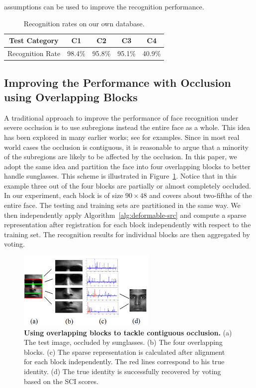 \documentclass[10pt,journal,letterpaper,compsoc]{IEEEtran}
\begin{document}
assumptions can be used to improve the recognition performance.
\begin{table}[h]
\vspace{0mm}
\centering \caption{Recognition rates on our own
database.} \vspace{0mm}
\begin{tabular}{|c|c|c|c|c| }
\hline
Test Category & C1 & C2 & C3 & C4  \\
\hline
\hline
Recognition Rate & 98.4\% & 95.8\% & 95.1\% & 40.9\% \\
\hline
\end{tabular}
\label{tab:UIUC-recognition} \vspace{-5mm}
\end{table}

\subsection{Improving the Performance with Occlusion using Overlapping Blocks}
A traditional approach to improve the performance of face
recognition under severe occlusion is to use subregions instead
the entire face as a whole. This idea has been explored in many
earlier works; see \cite{Pentland1994-CVPR, Wright2009-PAMI}
for examples. Since in most real world cases the occlusion is contiguous, it is reasonable to argue that a minority of the
subregions are likely to be affected by the occlusion. In this
paper, we adopt the same idea and partition the face into four
overlapping blocks to better handle sunglasses. This
scheme is illustrated in Figure~\ref{fig:occ-block}. Notice
that in this example three out of the four blocks are partially
or almost completely occluded. In our experiment, each block is
of size $90\times 48$ and covers about two-fifths of the entire
face. The testing and training sets are partitioned in the same
way. We then independently apply
Algorithm~\ref{alg:deformable-src} and compute a sparse
representation after registration for each block independently
with respect to the training set. The recognition
results for individual blocks are then aggregated by voting.

\begin{figure}
\centering
\includegraphics[width=2.6in]{figures_pami/occ_block.png}
\vspace{-2mm}
\caption{{\bf Using overlapping blocks to tackle contiguous occlusion.} (a) The test image, occluded by sunglasses. (b) The four overlapping blocks. (c) The sparse representation is calculated after alignment for each block independently. The red lines correspond to his true identity. (d) The true identity is successfully recovered by voting based on the SCI scores.}
\label{fig:occ-block}
\vspace{-5mm}
\end{figure}
\end{document}
